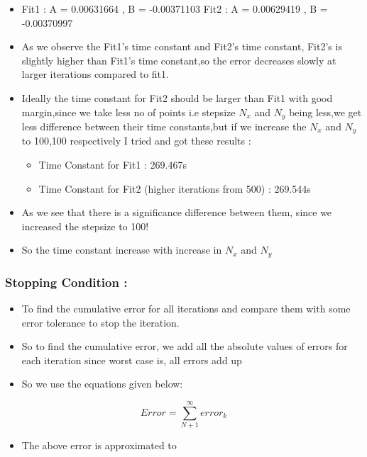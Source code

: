 \documentclass[11pt, a4paper]{article}
\begin{document}
\begin{itemize}
\item 
Fit1 : A = 0.00631664 , B = -0.00371103\newline
Fit2 : A = 0.00629419 , B = -0.00370997
\item
  As we observe the Fit1's time constant and Fit2's time constant,
  Fit2's is slightly higher than Fit1's time constant,so the error
  decreases slowly at larger iterations compared to fit1.
\item
  Ideally the time constant for Fit2 should be larger than Fit1 with
  good margin,since we take less no of points i.e stepsize \(N_x\) and
  \(N_y\) being less,we get less difference between their time
  constants,but if we increase the \(N_x\) and \(N_y\) to 100,100
  respectively I tried and got these results :

  \begin{itemize}
  \item
    Time Constant for Fit1 : 269.467s
  \item
    Time Constant for Fit2 (higher iterations from 500) : 269.544s
  \end{itemize}
\item
  As we see that there is a significance difference between them, since
  we increased the stepsize to 100!
\item
  So the time constant increase with increase in \(N_x\) and \(N_y\)
\end{itemize}
\newpage
\subsubsection{Stopping Condition :}\label{stopping-condition}

\begin{itemize}
\item
  To find the cumulative error for all iterations and compare them with
  some error tolerance to stop the iteration.
\item
  So to find the cumulative error, we add all the absolute values of
  errors for each iteration since worst case is, all errors add up
\item
  So we use the equations given below:
\end{itemize}

\begin{equation}
    Error = \sum_{N+1}^{\infty}error_k
  \end{equation}

\begin{itemize}
\item
  The above error is approximated to
\end{itemize}
\end{document}
